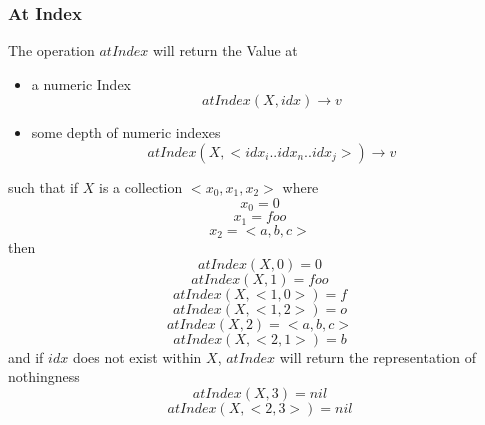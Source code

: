\documentclass[../main.tex]{subfiles}
\begin{document}
\subsubsection{At Index}
The operation $atIndex$ will return the Value at
\begin{itemize}
\item a numeric Index
  $$atIndex(X, idx) \to v$$
\item some depth of numeric indexes
  $$atIndex(X, <idx_{i}..idx_{n}..idx_{j}>) \to v$$
\end{itemize}
such that if $X$ is a collection $<x_{0}, x_{1}, x_{2}>$
where
$$x_{0} = 0$$
$$x_{1} = foo$$
$$x_{2} = <a, b, c>$$
then
$$atIndex(X, 0) = 0$$
$$atIndex(X, 1) = foo$$
$$atIndex (X, <1, 0>) = f$$
$$atIndex (X, <1, 2>) = o$$
$$atIndex(X, 2) = <a, b, c>$$
$$atIndex(X, <2, 1>) = b$$
and if $idx$ does not exist within $X$, $atIndex$ will return the representation of nothingness
$$atIndex(X, 3) = nil$$
$$atIndex(X, <2, 3>) = nil$$
\end{document}
